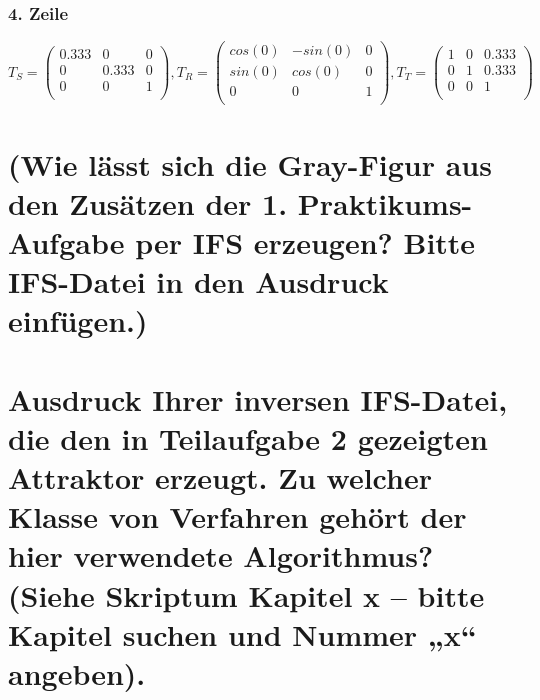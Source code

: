 \documentclass[]{article}
\begin{document}
\subsubsection*{4. Zeile}
\[
T_S = \begin{pmatrix}
0.333 & 0 & 0 \\
0 & 0.333 & 0 \\
0 & 0 & 1 \\
\end{pmatrix},
T_R = \begin{pmatrix}
cos(0) & -sin(0) & 0 \\
sin(0) & cos(0) & 0 \\
0 & 0 & 1 \\
\end{pmatrix},
T_T = \begin{pmatrix}
1 & 0 & 0.333 \\
0 & 1 & 0.333 \\
0 & 0 & 1 \\
\end{pmatrix}
\]
\section{(Wie lässt sich die Gray-Figur aus den Zusätzen der 1. Praktikums-Aufgabe per IFS erzeugen? Bitte IFS-Datei in den Ausdruck einfügen.)} 
\section{Ausdruck Ihrer inversen IFS-Datei, die den in Teilaufgabe 2 gezeigten Attraktor erzeugt. Zu welcher Klasse von Verfahren gehört der hier verwendete Algorithmus? (Siehe Skriptum Kapitel x – bitte Kapitel suchen und Nummer „x“ angeben).}
\end{document}

